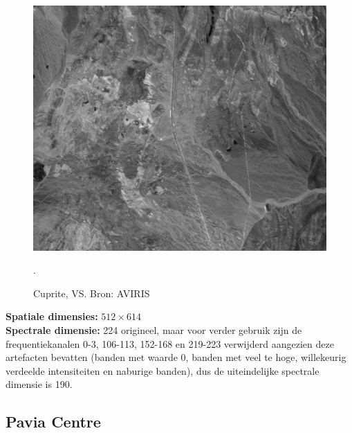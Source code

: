 \begin{figure}[H]
  \centering
  \includegraphics[scale=0.5]{images/cuprite_sum.png}
  \caption{Cuprite, VS. Bron: AVIRIS \cite{ref:cuprite}}.
  \label{fig:cuprite_sum}
\end{figure}

\textbf{Spatiale dimensies:} $512 \times 614$\\
\textbf{Spectrale dimensie:} 224 origineel, maar voor verder gebruik zijn de frequentiekanalen 0-3, 106-113, 152-168 en 219-223 verwijderd aangezien deze artefacten bevatten (banden met waarde 0, banden met veel te hoge, willekeurig verdeelde intensiteiten en naburige banden), dus de uiteindelijke spectrale dimensie is 190.

\subsection{Pavia Centre}

